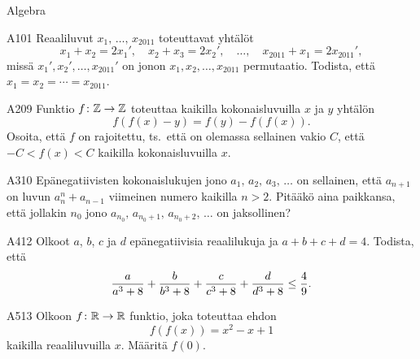 \begin{bwField}{Algebra}
  
\begin{bwProblem}{A}{1}{01}
Reaaliluvut $x_1,\,\dots,\,x_{2011}$ toteuttavat yhtälöt
$$x_1+x_2=2x_1',\quad x_2+x_3=2x_2',\quad \dots,\quad
x_{2011}+x_1=2x_{2011}',$$ missä $x_1',x_2',\ldots,x_{2011}'$ on
jonon $x_1,x_2,\ldots,x_{2011}$ permutaatio. Todista, että
$x_1=x_2=\cdots=x_{2011}$.
\end{bwProblem}

\begin{bwProblem}{A}{2}{09}
Funktio $f\colon\mathbb{Z}\to \mathbb{Z}$ toteuttaa kaikilla kokonaisluvuilla $x$
ja $y$ yhtälön $$f(f(x)-y)=f(y)-f(f(x)).$$ Osoita, että $f$ on
rajoitettu, ts.\ että on olemassa sellainen vakio $C$, että $-C<f(x)<C$
kaikilla kokonaisluvuilla $x$.
\end{bwProblem}

\begin{bwProblem}{A}{3}{10}
Epänegatiivisten kokonaislukujen jono
$a_1,\,a_2,\,a_3,\,\dots$ on sellainen, että $a_{n+1}$ on luvun
$a_n^n+a_{n-1}$ viimeinen numero kaikilla $n>2$. Pitääkö aina
paikkansa, että jollakin $n_0$ jono
$a_{n_0},\,a_{n_0+1},\,a_{n_0+2},\,\dots$ on jaksollinen?
\end{bwProblem}

\begin{bwProblem}{A}{4}{12}
Olkoot $a$, $b$, $c$ ja $d$ epänegatiivisia reaalilukuja ja
$a+b+c+d=4$. Todista, että 
  \[
{a\over a^3+8}+{b\over b^3+8}+{c\over c^3+8}+{d\over d^3+8}\le {4\over 9}.
  \]
\end{bwProblem}

\begin{bwProblem}{A}{5}{13}
Olkoon $f\colon\mathbb{R}\to\mathbb{R}$ funktio, joka toteuttaa ehdon
$$f(f(x))=x^2-x+1$$ kaikilla reaaliluvuilla $x$. Määritä $f(0)$.
\end{bwProblem}

\end{bwField}